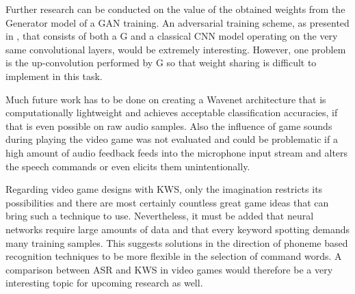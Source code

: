 Further research can be conducted on the value of the obtained weights from the Generator model of a GAN training. 
An adversarial training scheme, as presented in \cite{Oezdenizci2020}, that consists of both a G and a classical CNN model operating on the very same convolutional layers, would be extremely interesting. 
However, one problem is the up-convolution performed by G so that weight sharing is difficult to implement in this task.

Much future work has to be done on creating a Wavenet architecture that is computationally lightweight and achieves acceptable classification accuracies, if that is even possible on raw audio samples.
Also the influence of game sounds during playing the video game was not evaluated and could be problematic if a high amount of audio feedback feeds into the microphone input stream and alters the speech commands or even elicits them unintentionally.

Regarding video game designs with KWS, only the imagination restricts its possibilities and there are most certainly countless great game ideas that can bring such a technique to use.
Nevertheless, it must be added that neural networks require large amounts of data and that every keyword spotting demands many training samples.
This suggests solutions in the direction of phoneme based recognition techniques to be more flexible in the selection of command words.
A comparison between ASR and KWS in video games would therefore be a very interesting topic for upcoming research as well.
